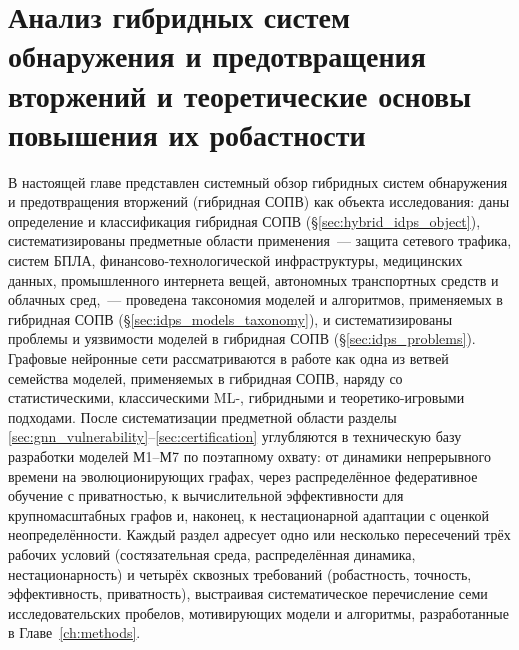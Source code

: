 
\chapter{Анализ гибридных систем обнаружения и предотвращения вторжений и теоретические основы повышения их робастности}
\label{ch:literature}

В настоящей главе представлен системный обзор гибридных систем
обнаружения и предотвращения вторжений (гибридная СОПВ) как объекта
исследования: даны определение и классификация гибридная СОПВ
(\S\ref{sec:hybrid_idps_object}), систематизированы предметные области
применения~--- защита сетевого трафика, систем БПЛА, финансово-технологической
инфраструктуры, медицинских данных, промышленного интернета вещей,
автономных транспортных средств и облачных сред,~--- проведена
таксономия моделей и алгоритмов, применяемых в гибридная СОПВ
(\S\ref{sec:idps_models_taxonomy}), и систематизированы проблемы и
уязвимости моделей в гибридная СОПВ (\S\ref{sec:idps_problems}).
Графовые нейронные сети рассматриваются в работе как одна из ветвей
семейства моделей, применяемых в гибридная СОПВ, наряду со
статистическими, классическими ML-, гибридными и теоретико-игровыми
подходами. После систематизации предметной области разделы
\ref{sec:gnn_vulnerability}--\ref{sec:certification} углубляются
в техническую базу разработки моделей М1--М7 по поэтапному охвату:
от динамики непрерывного времени на эволюционирующих графах, через
распределённое федеративное обучение с приватностью, к вычислительной
эффективности для крупномасштабных графов и, наконец, к
нестационарной адаптации с оценкой неопределённости. Каждый раздел
адресует одно или несколько пересечений трёх рабочих условий
(состязательная среда, распределённая динамика, нестационарность) и
четырёх сквозных требований (робастность, точность, эффективность,
приватность), выстраивая систематическое перечисление семи
исследовательских пробелов, мотивирующих модели и алгоритмы,
разработанные в Главе~\ref{ch:methods}.


